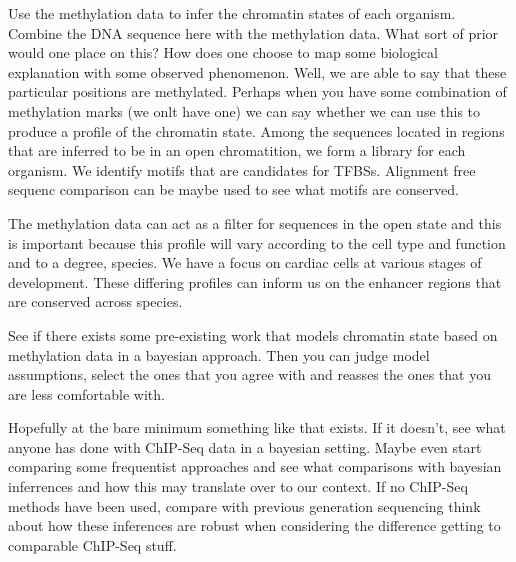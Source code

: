 Use the methylation data to infer the chromatin states of each organism. Combine the DNA sequence here with the methylation data. What sort of prior would one place on this? How does one choose to map some biological explanation with some observed phenomenon. Well, we are able to say that these particular positions are methylated. Perhaps when you have some combination of methylation marks (we onlt have one) we can say whether we can use this to produce a profile of the chromatin state. Among the sequences located in regions that are inferred to be in an open chromatition, we form a library for each organism. We identify motifs that are candidates for TFBSs. Alignment free sequenc comparison can be maybe used to see what motifs are conserved. 

The methylation data can act as a filter for sequences in the open state and this is important because this profile will vary according to the cell type and function and to a degree, species. We have a focus on cardiac cells at various stages of development. These differing profiles can inform us on the enhancer regions that are conserved across species. 

See if there exists some pre-existing work that models chromatin state based on methylation data in a bayesian approach. Then you can judge model assumptions, select the ones that you agree with and reasses the ones that you are less comfortable with. 

Hopefully at the bare minimum something like that exists. If it doesn't, see what anyone has done with ChIP-Seq data in a bayesian setting. Maybe even start comparing some frequentist approaches and see what comparisons with bayesian inferrences and how this may translate over to our context. If no ChIP-Seq methods have been used, compare with previous generation sequencing think about how these inferences are robust when considering the difference getting to comparable ChIP-Seq stuff. 